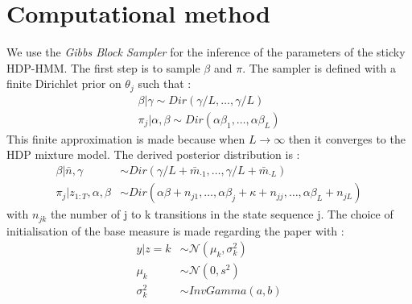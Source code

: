 \section{Computational method}
We use the \textit{Gibbs Block Sampler} \cite{fox_sticky_2011} for the inference of the parameters of the sticky HDP-HMM. The first step is to sample $\beta$ and $\pi$. The sampler is defined with a finite Dirichlet prior on $\theta_j$ such that : 
\begin{align*}
	\beta | \gamma \sim Dir(\gamma/L, \dots, \gamma/L) \\
	\pi_j | \alpha, \beta \sim Dir (\alpha\beta_1, \dots, \alpha\beta_L)
\end{align*}
This finite approximation is made because when $L\to\infty$ then it converges to the HDP mixture model. The derived posterior distribution is : 
\begin{align*}
	\beta|\bar{n},\gamma &\sim Dir(\gamma/L+\bar m_{\cdot1}, \dots, \gamma/L+ \bar m_{\cdot L}) \\
	\pi_j | z_{1:T},\alpha, \beta &\sim Dir(\alpha\beta+n_{j1}, \dots, \alpha\beta_j+\kappa + n_{jj}, \dots, \alpha \beta_L+n_{jL})
\end{align*}
with $n_{jk}$ the number of j to k transitions in the state sequence j.
The choice of initialisation of the base measure is made regarding the paper \cite{fox_sticky_2011} with :  
\begin{equation}
	\label{equ:basemeasure}
\begin{split}
	y|z=k&\sim \mathcal N (\mu_k, \sigma_k^2) \\
	\mu_k &\sim \mathcal N (0, s^2) \\
	\sigma^2_k &\sim InvGamma(a,b)
\end{split}
\end{equation}
	

